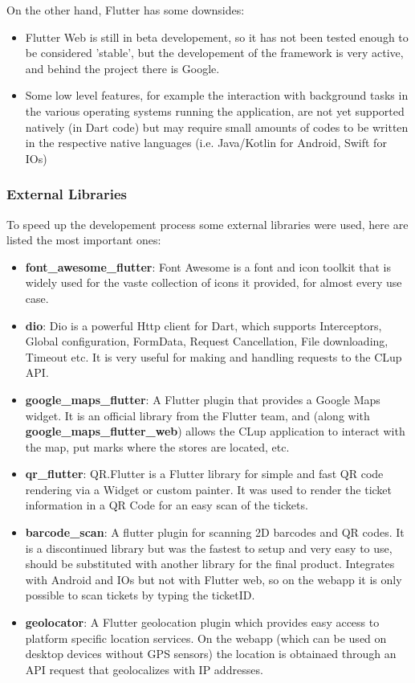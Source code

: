 On the other hand, Flutter has some downsides:
\begin{itemize}
    \item Flutter Web is still in beta developement, so it has not been tested enough to be considered 'stable', but the developement of the framework is very active, and behind the project there is Google.
    \item Some low level features, for example the interaction with background tasks in the various operating systems running the application, are not yet supported natively (in Dart code) but may require small amounts of codes to be written in the respective native languages (i.e. Java/Kotlin for Android, Swift for IOs)
\end{itemize}

\subsubsection{External Libraries}

To speed up the developement process some external libraries were used, here are listed the most important ones:

\begin{itemize}
    \item \textbf{font\_awesome\_flutter}: Font Awesome is a font and icon toolkit that is widely used for the vaste collection of icons it provided, for almost every use case.
    \item \textbf{dio}: Dio is a powerful Http client for Dart, which supports Interceptors, Global configuration, FormData, Request Cancellation, File downloading, Timeout etc. It is very useful for making and handling requests to the CLup API.
    \item \textbf{google\_maps\_flutter}: A Flutter plugin that provides a Google Maps widget. It is an official library from the Flutter team, and (along with \textbf{google\_maps\_flutter\_web}) allows the CLup application to interact with the map, put marks where the stores are located, etc.
    \item \textbf{qr\_flutter}: QR.Flutter is a Flutter library for simple and fast QR code rendering via a Widget or custom painter. It was used to render the ticket information in a QR Code for an easy scan of the tickets.
    \item \textbf{barcode\_scan}: A flutter plugin for scanning 2D barcodes and QR codes. It is a discontinued library but was the fastest to setup and very easy to use, should be substituted with another library for the final product. Integrates with Android and IOs but not with Flutter web, so on the webapp it is only possible to scan tickets by typing the ticketID.
    \item \textbf{geolocator}: A Flutter geolocation plugin which provides easy access to platform specific location services. On the webapp (which can be used on desktop devices without GPS sensors) the location is obtainaed through an API request that geolocalizes with IP addresses.
\end{itemize}